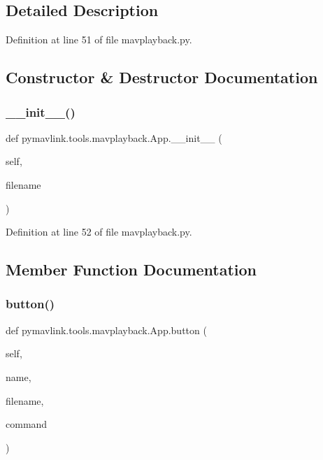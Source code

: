 \subsection{Detailed Description}


Definition at line 51 of file mavplayback.\+py.



\subsection{Constructor \& Destructor Documentation}
\mbox{\label{classpymavlink_1_1tools_1_1mavplayback_1_1App_a5ee472eff5d8d9bb42bd20337e7a0d18}} 
\subsubsection{\texorpdfstring{\_\_init\_\_()}{\_\_init\_\_()}}
{\footnotesize\ttfamily def pymavlink.\+tools.\+mavplayback.\+App.\+\_\+\+\_\+init\+\_\+\+\_\+ (\begin{DoxyParamCaption}\item[{}]{self,  }\item[{}]{filename }\end{DoxyParamCaption})}



Definition at line 52 of file mavplayback.\+py.



\subsection{Member Function Documentation}
\mbox{\label{classpymavlink_1_1tools_1_1mavplayback_1_1App_aada9c02d6fe0a6cf30eca06a9cc4b01b}} 
\subsubsection{\texorpdfstring{button()}{button()}}
{\footnotesize\ttfamily def pymavlink.\+tools.\+mavplayback.\+App.\+button (\begin{DoxyParamCaption}\item[{}]{self,  }\item[{}]{name,  }\item[{}]{filename,  }\item[{}]{command }\end{DoxyParamCaption})}

